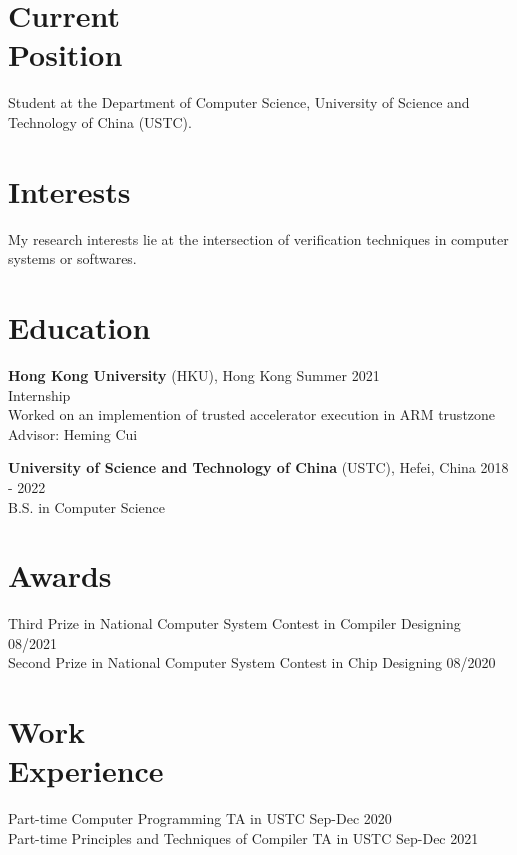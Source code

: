 \documentclass[margin, 10pt]{res}
\begin{document}
\address{{\bf Present Address} \\ Dept. of Computer Science\\ USTC\\
        230026 Hefei, P.R.China  }
\address{{\bf Contact Info} \\ (+86)18618154314 \\
         zhuez1819@mail.ustc.edu.cn }

\begin{resume}

\section{Current \\ Position}
Student at the Department of Computer Science, University of Science and Technology of China (USTC).

\section{Interests}
My research interests lie at the intersection of verification techniques in computer systems or softwares.

\section{Education}
{\bf Hong Kong University} (HKU), Hong Kong  \hfill Summer 2021 \\
Internship\\
Worked on an implemention of trusted accelerator execution in ARM trustzone \\
Advisor: Heming Cui

{\bf University of Science and Technology of China} (USTC), Hefei, China \hfill 2018 - 2022 \\
B.S. in Computer Science

\section{Awards}
Third Prize in National Computer System Contest in Compiler Designing \hfill 08/2021 \\
Second Prize in National Computer System Contest in Chip Designing \hfill 08/2020

\section{Work \\ Experience}
Part-time Computer Programming TA in USTC \hfill Sep-Dec 2020 \\
Part-time Principles and Techniques of Compiler TA in USTC \hfill Sep-Dec 2021


\end{resume}
\end{document}
